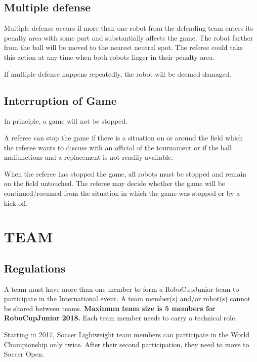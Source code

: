 \documentclass{article}
\begin{document}
\subsection{Multiple defense \label{ref-013}}

Multiple defense occurs if more than one robot from the defending team enters its penalty area with some part and substantially affects the game. The robot farther from the ball will be moved to the nearest neutral spot. The referee could take this action at any time when both robots linger in their penalty area.

If multiple defense happens repeatedly, the robot will be deemed damaged.

\subsection{ Interruption of Game \label{ref-014}}

In principle, a game will not be stopped.

A referee can stop the game if there is a situation on or around the field which the referee wants to discuss with an official of the tournament or if the ball malfunctions and a replacement is not readily available.

When the referee has stopped the game, all robots must be stopped and remain on the field untouched. The referee may decide whether the game will be continued/resumed from the situation in which the game was stopped or by a kick-off.

\textbf{}

\section{TEAM \label{ref-015}}

\subsection{ Regulations \label{ref-016}}

A team must have more than one member to form a RoboCupJunior team to participate in the International event. A team member(s) and/or robot(s) cannot be shared between teams. \textbf{Maximum team size is 5 members for RoboCupJunior 2018.} Each team member needs to carry a technical role.

Starting in 2017, Soccer Lightweight team members can participate in the World Championship only twice. After their second participation, they need to move to Soccer Open.
\end{document}
